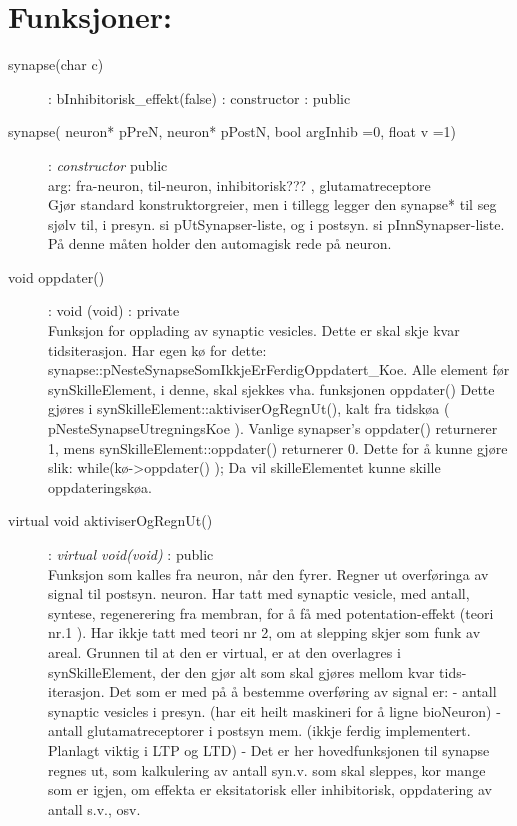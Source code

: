 \documentclass[norsk,11 pt]{report}
\begin{document}
	\section{Funksjoner:}
	\begin{description} 
	 	\item[synapse(char c)] : bInhibitorisk\_effekt(false)  	: 	constructor 	:  	public \\

	 	\item[synapse( neuron* pPreN, neuron* pPostN, bool argInhib =0, float v =1)] 	: \textit{constructor} 	public \\
 		arg:        fra-neuron,     til-neuron, inhibitorisk??? , glutamatreceptore \\
		Gjør standard konstruktorgreier, men i tillegg legger den synapse* til seg sjølv til, i presyn. si pUtSynapser-liste, og i postsyn. si 
		pInnSynapser-liste. På denne måten holder den automagisk rede på neuron. 
	
		\item[void oppdater()] 		: 	void (void) 	: 	private\\
		Funksjon for opplading av synaptic vesicles. Dette er skal skje kvar tidsiterasjon. Har egen kø for dette: 
		synapse::pNesteSynapseSomIkkjeErFerdigOppdatert\_Koe. Alle element før synSkilleElement, i denne, skal sjekkes vha. funksjonen oppdater() 
		Dette gjøres i synSkilleElement::aktiviserOgRegnUt(), kalt fra tidskøa ( pNesteSynapseUtregningsKoe ).
		Vanlige synapser's oppdater() returnerer 1, mens synSkilleElement::oppdater() returnerer 0. Dette for å kunne gjøre slik: 
		while(kø->oppdater() ); Da vil skilleElementet kunne skille oppdateringskøa.

		\item[virtual void aktiviserOgRegnUt()] : 	\textit{virtual void(void)} : 	public \\
		Funksjon som kalles fra neuron, når den fyrer. Regner ut overføringa av signal til postsyn. neuron. Har tatt med synaptic vesicle, med 
		antall, syntese, regenerering fra membran, for å få med potentation-effekt (teori nr.1 ). Har ikkje tatt med teori nr 2, om at slepping
		skjer som funk av areal.
		Grunnen til at den er virtual, er at den overlagres i synSkilleElement, der den gjør alt som skal gjøres mellom kvar tids-iterasjon.
		Det som er med på å bestemme overføring av signal er:
			- antall synaptic vesicles i presyn. (har eit heilt maskineri for å ligne bioNeuron)
			- antall glutamatreceptorer i postsyn mem. (ikkje ferdig implementert. Planlagt viktig i LTP og LTD)
		- Det er her hovedfunksjonen til synapse regnes ut, som kalkulering av antall syn.v. som skal sleppes, kor mange som er igjen, om effekta er
		eksitatorisk eller inhibitorisk, oppdatering av antall s.v., osv.
	\end{description}
\end{document}
